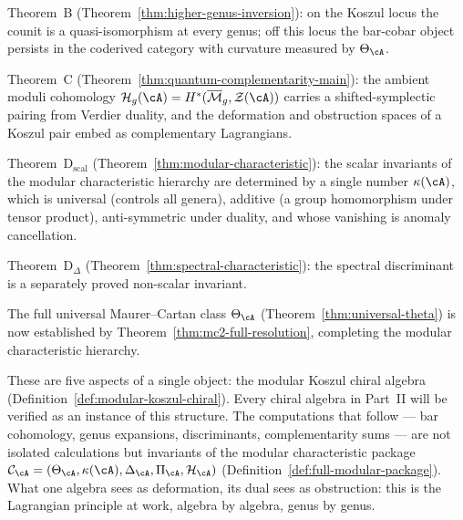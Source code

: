 Theorem~B
(Theorem~\ref{thm:higher-genus-inversion}): on the Koszul locus the
counit is a quasi-isomorphism at every genus; off this locus the
bar-cobar object persists in the coderived category with curvature
measured by $\Theta_{\cA}$.

Theorem~C
(Theorem~\ref{thm:quantum-complementarity-main}): the ambient
moduli cohomology $\mathcal{H}_g(\cA) =
H^*(\overline{\mathcal{M}}_g, \mathcal{Z}(\cA))$ carries a
shifted-symplectic pairing from Verdier duality, and the deformation
and obstruction spaces of a Koszul pair embed as complementary
Lagrangians.

Theorem~D$_{\mathrm{scal}}$
(Theorem~\ref{thm:modular-characteristic}): the scalar invariants
of the modular characteristic hierarchy are determined by a single
number $\kappa(\cA)$, which is universal (controls all genera),
additive (a group homomorphism under tensor product), anti-symmetric
under duality, and whose vanishing is anomaly cancellation.

Theorem~D$_\Delta$
(Theorem~\ref{thm:spectral-characteristic}): the spectral
discriminant is a separately proved non-scalar invariant.

The full universal Maurer--Cartan class $\Theta_{\cA}$
(Theorem~\ref{thm:universal-theta}) is now established by
Theorem~\ref{thm:mc2-full-resolution}, completing the modular
characteristic hierarchy.

These are five aspects of a single object: the modular Koszul chiral
algebra (Definition~\ref{def:modular-koszul-chiral}).  Every chiral
algebra in Part~II will be verified as an instance of this structure.
The computations that follow --- bar cohomology, genus expansions,
discriminants, complementarity sums --- are not
isolated calculations but invariants of the modular characteristic
package $\mathcal{C}_{\cA} = (\Theta_{\cA}, \kappa(\cA),
\Delta_{\cA}, \Pi_{\cA}, \mathcal{H}_{\cA})$
(Definition~\ref{def:full-modular-package}).
What one algebra sees as
deformation, its dual sees as obstruction: this is the Lagrangian
principle at work, algebra by algebra, genus by genus.
